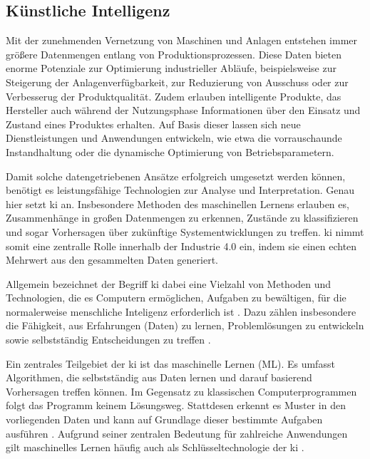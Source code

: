 \subsection{Künstliche Intelligenz}
Mit der zunehmenden Vernetzung von Maschinen und Anlagen entstehen immer größere Datenmengen entlang von Produktionsprozessen.
Diese Daten bieten enorme Potenziale zur Optimierung industrieller Abläufe, beispielsweise zur Steigerung der Anlagenverfügbarkeit, zur Reduzierung von Ausschuss oder zur Verbesserug der Produktqualität.
Zudem erlauben intelligente Produkte, das Hersteller auch während der Nutzungsphase Informationen über den Einsatz und Zustand eines Produktes erhalten.
Auf Basis dieser lassen sich neue Dienstleistungen und Anwendungen entwickeln, wie etwa die vorrauschaunde Instandhaltung oder die dynamische Optimierung von Betriebsparametern.

Damit solche datengetriebenen Ansätze erfolgreich umgesetzt werden können, benötigt es leistungsfähige Technologien zur Analyse und Interpretation.
Genau hier setzt \acs{ki} an.
Insbesondere Methoden des maschinellen Lernens erlauben es, Zusammenhänge in großen Datenmengen zu erkennen, Zustände zu klassifizieren und sogar Vorhersagen über zukünftige Systementwicklungen zu treffen. \cite{KIEinführung} 
\acs{ki} nimmt somit eine zentralle Rolle innerhalb der Industrie 4.0 ein, indem sie einen echten Mehrwert aus den gesammelten Daten generiert.

Allgemein bezeichnet der Begriff \acs{ki} dabei eine Vielzahl von Methoden und Technologien, die es Computern ermöglichen, Aufgaben zu bewältigen, für die normalerweise menschliche Inteligenz erforderlich ist \cite{KIDefinition1}.
Dazu zählen insbesondere die Fähigkeit, aus Erfahrungen (Daten) zu lernen, Problemlösungen zu entwickeln sowie selbstständig Entscheidungen zu treffen \cite{KIDefinition2}.

Ein zentrales Teilgebiet der \acs{ki} ist das maschinelle Lernen (ML).
Es umfasst Algorithmen, die selbstständig aus Daten lernen und darauf basierend Vorhersagen treffen können.
Im Gegensatz zu klassischen Computerprogrammen folgt das Programm keinem Lösungsweg. 
Stattdesen erkennt es Muster in den vorliegenden Daten und kann auf Grundlage dieser bestimmte Aufgaben ausführen \cite{MLDefinition}.
Aufgrund seiner zentralen Bedeutung für zahlreiche Anwendungen gilt maschinelles Lernen häufig auch als Schlüsseltechnologie der \acs{ki} \cite{MLSchlüsseltechnologie}. 

